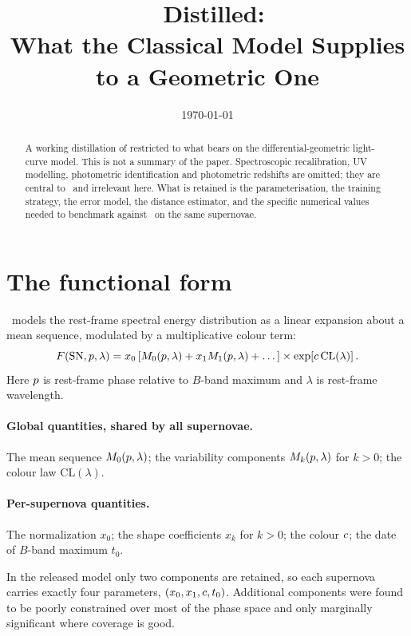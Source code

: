 \documentclass[11pt]{article}
\title{\salt\ Distilled: \\ What the Classical Model Supplies to a Geometric One}
\date{\today}
\begin{document}
\maketitle

\begin{abstract}
A working distillation of \citet{Guy2007} restricted to what bears on the
differential-geometric light-curve model. This is not a summary of the paper.
Spectroscopic recalibration, UV modelling, photometric identification and
photometric redshifts are omitted; they are central to \salt\ and irrelevant
here. What is retained is the parameterisation, the training strategy, the
error model, the distance estimator, and the specific numerical values needed
to benchmark against \salt\ on the same supernovae.
\end{abstract}

\section{The functional form}

\salt\ models the rest-frame spectral energy distribution as a linear expansion
about a mean sequence, modulated by a multiplicative colour term:
\begin{equation}
  F(\mathrm{SN}, p, \lambda)
    = x_{0}\left[M_{0}(p,\lambda) + x_{1}M_{1}(p,\lambda) + \dots\right]
      \times \exp\!\left[c\,\mathrm{CL}(\lambda)\right].
  \label{eq:salt2form}
\end{equation}
Here $p$ is rest-frame phase relative to $B$-band maximum and $\lambda$ is
rest-frame wavelength.

\paragraph{Global quantities, shared by all supernovae.} The mean sequence
$M_{0}(p,\lambda)$; the variability components $M_{k}(p,\lambda)$ for
$k>0$; the colour law $\mathrm{CL}(\lambda)$.

\paragraph{Per-supernova quantities.} The normalization $x_{0}$; the shape
coefficients $x_{k}$ for $k>0$; the colour $c$; the date of $B$-band
maximum $t_{0}$.

In the released model only two components are retained, so each supernova
carries exactly four parameters, $(x_{0}, x_{1}, c, t_{0})$. Additional
components were found to be poorly constrained over most of the phase space and
only marginally significant where coverage is good.
\end{document}
